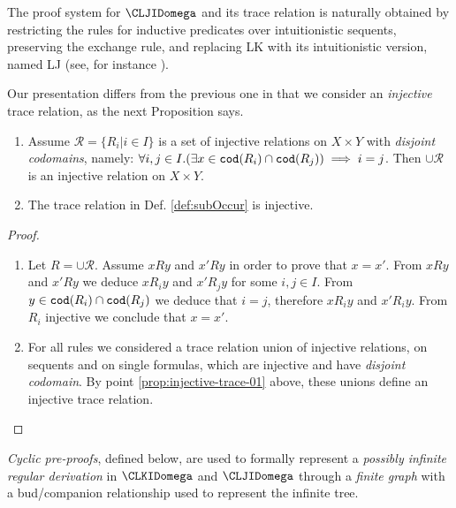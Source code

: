 The proof system for $\CLJIDomega$ and its trace relation is naturally obtained by restricting the rules for inductive predicates over intuitionistic sequents, preserving the exchange rule, and replacing LK with its intuitionistic version, named LJ (see, for instance \cite{Berardi}). 

Our presentation differs from the previous one in that we consider an \emph{injective} trace
relation, as the next Proposition says.

\newcommand{\codom} {{\tt cod}}

\begin{proposition}
\label{prop:injective-trace}
\begin{enumerate}
\item
\label{prop:injective-trace-01}
Assume ${\mathcal R} = \{R_i | i \in I\}$ is a set of injective relations on $X \times Y$
with \emph{disjoint codomains}, namely: $\forall i,j\in I. (\exists x \in \codom(R_i) \cap \codom(R_j)) \implies i=j$.
Then $\cup {\mathcal R}$ is an injective relation on $X \times Y$. 
\item
\label{prop:injective-trace-02}
The trace relation in Def. \ref{def:subOccur} is injective.
\end{enumerate}
\end{proposition}

\begin{proof}
\begin{enumerate}
\item
Let $R = \cup {\mathcal R}$. Assume $x R y$ and $x' R y$ in order to prove that
$x = x'$. From $x R y$ and $x' R y$ we deduce
$x R_i y$ and $x' R_j y$ for some $i,j \in I$. From $y \in \codom(R_i) \cap \codom(R_j)$
we deduce that $i = j$, therefore $x R_i y$ and $x' R_i y$. 
From $R_i$ injective we conclude that $x = x'$.
\item
For all rules we considered a trace relation union of injective relations, 
on sequents and on single formulas, which are injective and have \emph{disjoint codomain}. 
By point \ref{prop:injective-trace-01} above, these unions define an injective trace relation.
\end{enumerate}
\end{proof}

\emph{Cyclic pre-proofs}, defined below, are used to formally represent a 
\emph{possibly infinite regular derivation} in $\CLKIDomega$ and $\CLJIDomega$
 through a \emph{finite graph} with a bud/companion relationship used to represent 
 the infinite tree.

